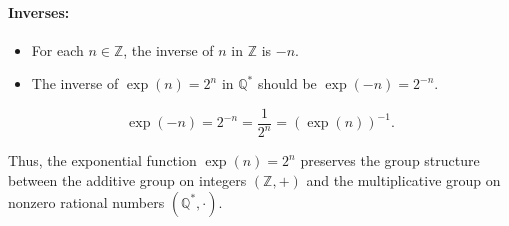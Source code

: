 \paragraph{Inverses:}
\begin{itemize}
	\item For each \( n \in \mathbb{Z} \), the inverse of \( n \) in \(\mathbb{Z}\) is \(-n\).
	\item The inverse of \( \exp(n) = 2^n \) in \(\mathbb{Q}^*\) should be \( \exp(-n) = 2^{-n} \).
\end{itemize}
\[
\exp(-n) = 2^{-n} = \frac{1}{2^n} = (\exp(n))^{-1}.
\]

Thus, the exponential function \( \exp(n) = 2^n \) preserves the group structure between the additive group on integers \((\mathbb{Z}, +)\) and the multiplicative group on nonzero rational numbers \((\mathbb{Q}^*, \cdot)\).

